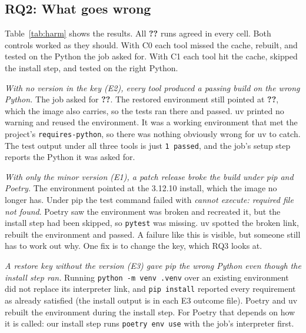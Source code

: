\documentclass[10pt,a4paper]{article}
\newcommand{\ck}[1]{\textbf{??}}\newcommand{\repourl}{\url{https://github.com/mark124/cache-key-soundness}}%
\begin{document}
\subsection{RQ2: What goes wrong}
\label{sec:rq2}

\begin{table}[t]\centering\small
\caption{What happened when a cached environment was restored, by condition
and tool. All \ck{t3.runs} runs gave the same result. \emph{correct (hit)} and
\emph{correct (miss)} refer to the exact key; \emph{stale restore, rebuilt}
means a restore key brought back the 3.11 environment and the install step
replaced it. Produced by
\texttt{make table3} from \texttt{results/table3\_matrix.csv}; the per-run
records, with links to the public logs, are in
\texttt{results/table3\_harm.csv}.}
\label{tab:harm}
\end{table}

Table~\ref{tab:harm} shows the results. All \ck{t3.runs} runs agreed in every
cell. Both controls worked as they should. With C0 each tool missed the
cache, rebuilt, and tested on the Python the job asked for. With C1 each tool
hit the cache, skipped the install step, and tested on the right Python.

\emph{With no version in the key (E2), every tool produced a passing build on
the wrong Python.} The job asked for \ck{t3.E2_pip_asked}. The restored
environment still pointed at \ck{t3.E2_pip_ran_on}, which the image also
carries, so the tests ran there and passed. uv printed no warning and reused
the environment. It was a working environment that met the project's
\texttt{requires-python}, so there was nothing obviously wrong for uv to
catch. The test output under all three tools is just \texttt{1 passed}, and the
job's setup step reports the Python it was asked for.

\emph{With only the minor version (E1), a patch release broke the build under
pip and Poetry.} The environment pointed at the 3.12.10 install, which the
image no longer has. Under pip the test command failed with \emph{cannot
execute: required file not found}. Poetry saw the environment was broken and
recreated it, but the install step had been skipped, so \texttt{pytest} was
missing. uv spotted the broken link, rebuilt the environment and passed. A
failure like this is visible, but someone still has to work out why. One
fix is to change the key, which RQ3 looks at.


\emph{A restore key without the version (E3) gave pip the wrong Python even
though the install step ran.} Running \texttt{python -m venv .venv} over an
existing environment did not replace its interpreter link, and
\texttt{pip install} reported every requirement as already satisfied (the
install output is in each E3 outcome file). Poetry and uv
rebuilt the environment during the install step. For Poetry that depends on
how it is called: our install step runs \texttt{poetry env use} with the job's
interpreter first.
\end{document}
